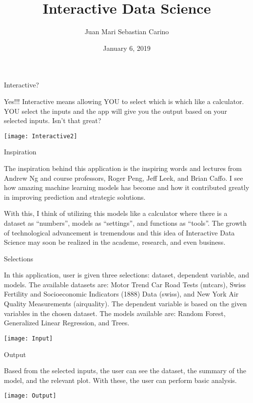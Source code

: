 \documentclass[ignorenonframetext,]{beamer}
\title{Interactive Data Science}
\author{Juan Mari Sebastian Carino}
\date{January 6, 2019}
\begin{document}
\frame{\titlepage}

\begin{frame}{Interactive?}

Yes!!! Interactive means allowing YOU to select which is which like a
calculator. YOU select the inputs and the app will give you the output
based on your selected inputs. Isn't that great?

\begin{center}\texttt{[image: Interactive2]} \end{center}

\end{frame}

\begin{frame}{Inspiration}

The inspiration behind this application is the inspiring words and
lectures from Andrew Ng and course professors, Roger Peng, Jeff Leek,
and Brian Caffo. I see how amazing machine learning models has become
and how it contributed greatly in improving prediction and strategic
solutions.

With this, I think of utilizing this models like a calculator where
there is a dataset as ``numbers'', models as ``settings'', and functions
as ``tools''. The growth of technological advancement is tremendous and
this idea of Interactive Data Science may soon be realized in the
academe, research, and even business.

\end{frame}

\begin{frame}{Selections}

In this application, user is given three selections: dataset, dependent
variable, and models. The available datasets are: Motor Trend Car Road
Tests (mtcars), Swiss Fertility and Socioeconomic Indicators (1888) Data
(swiss), and New York Air Quality Measurements (airquality). The
dependent variable is based on the given variables in the chosen
dataset. The models available are: Random Forest, Generalized Linear
Regression, and Trees.

\texttt{[image: Input]}

\end{frame}

\begin{frame}{Output}

Based from the selected inputs, the user can see the dataset, the
summary of the model, and the relevant plot. With these, the user can
perform basic analysis.

\texttt{[image: Output]}

\end{frame}
\end{document}
